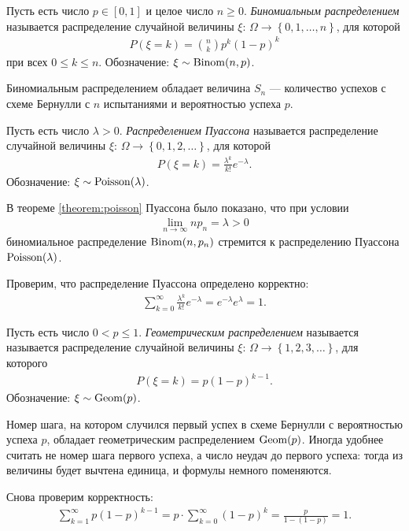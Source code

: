 \documentclass[../main.tex]{subfiles}
\begin{document}
\begin{exmpl} Пусть есть число $ p \in [0,1] $ и целое число $ n \geqslant 0 $. \textit{Биномиальным распределением} называется распределение случайной величины $ \xi \colon\, \Omega \to \left\{ 0, 1, \ldots, n \right\} $, для которой
 \begin{align*}
  P(\xi = k) = \binom n k p^{k}(1-p)^{k}
 \end{align*} при всех $ 0 \leqslant k \leqslant n $. Обозначение: $ \xi \sim \mathrm{Binom}(n,p) $.

 Биномиальным распределением обладает величина $ S_n $ --- количество успехов с схеме Бернулли с $ n $ испытаниями и вероятностью успеха $ p $.
\end{exmpl}
\begin{exmpl}
 Пусть есть число $ \lambda > 0 $. \textit{Распределением Пуассона} называется распределение случайной величины $ \xi\colon\,\Omega\to \left\{ 0,1,2,\ldots \right\} $, для которой
 \begin{align*}
  P(\xi = k) = \frac{\lambda^{k}}{k!} e^{-\lambda}.
 \end{align*} Обозначение: $ \xi \sim  \mathrm{Poisson}(\lambda)$.

 В теореме \ref{theorem:poisson} Пуассона было показано, что при условии
 \begin{align*}
  \lim_{n \to \infty} np_n = \lambda > 0 
 \end{align*} биномиальное распределение $ \mathrm{Binom}(n,p_n) $ стремится к распределению Пуассона $ \mathrm{Poisson}(\lambda) $.

 Проверим, что распределение Пуассона определено корректно:
 \begin{align*}
  \sum_{k=0}^{\infty} \frac{\lambda^{k}}{k!}e^{-\lambda} = e^{-\lambda} e^{\lambda} = 1.
 \end{align*} 
\end{exmpl}
\begin{exmpl}
 Пусть есть число $ 0 < p \leqslant 1 $. \textit{Геометрическим распределением} называется называется распределение случайной величины $ \xi \colon\,\Omega \to \left\{ 1,2,3,\ldots \right\} $, для которого
 \begin{align*}
  P(\xi = k) = p(1-p)^{k-1}.
 \end{align*} Обозначение: $ \xi \sim \mathrm{Geom}(p) $.

 Номер шага, на котором случился первый успех в схеме Бернулли с вероятностью успеха $ p $, обладает геометрическим распределением $ \mathrm{Geom}(p) $. Иногда удобнее считать не номер шага первого успеха, а число неудач до первого успеха: тогда из величины будет вычтена единица, и формулы немного поменяются.

 Снова проверим корректность:
 \begin{align*}
  \sum_{k=1}^{\infty} p(1-p)^{k-1} = p \cdot \sum_{k=0}^{\infty} (1-p)^{k} = \frac{p}{1 - (1-p)} = 1.
 \end{align*} 
\end{exmpl}
\end{document}
